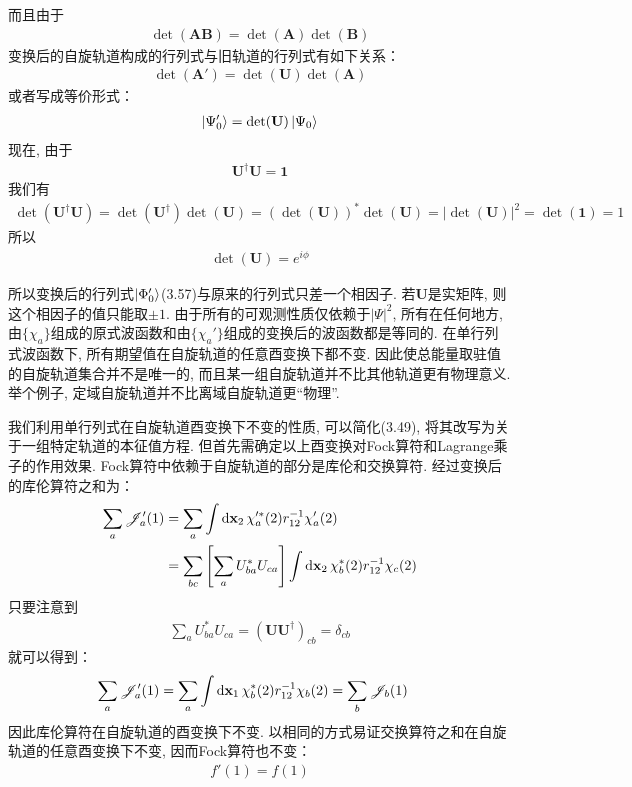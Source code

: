 而且由于
\begin{align}
	\det(\mathbf{AB}) = \det(\mathbf{A})\det(\mathbf{B})
\end{align}
变换后的自旋轨道构成的行列式与旧轨道的行列式有如下关系：
\begin{align}
	\det(\mathbf{A}') = \det(\mathbf{U})\det(\mathbf{A})
\end{align}
或者写成等价形式：
\begin{align}
	\Ket{\Psi_0'} = \det(\mathbf{U})\Ket{\Psi_0}
\end{align}
现在, 
由于
\begin{align}
	\mathbf{U}^\dagger\mathbf{U} = \mathbf{1}
\end{align}
我们有
\begin{align}
	\det(\mathbf{U}^\dagger\mathbf{U}) = \det(\mathbf{U}^\dagger)\det(\mathbf{U}) = (\det(\mathbf{U}))^*\det(\mathbf{U}) = |\det(\mathbf{U})|^2 = \det(\mathbf{1}) = 1
\end{align}
所以
\begin{align}
	\det(\mathbf{U}) = e^{i\phi}
\end{align}

所以变换后的行列式$\Ket{\Phi_0'}$(3.57)与原来的行列式只差一个相因子. 
若$\mathbf{U}$是实矩阵, 
则这个相因子的值只能取$\pm 1$. 
由于所有的可观测性质仅依赖于$|\Psi|^2$, 
所有在任何地方, 
由$\{\chi_a\}$组成的原式波函数和由$\{\chi_a'\}$组成的变换后的波函数都是等同的. 
在单行列式波函数下, 
所有期望值在自旋轨道的任意酉变换下都不变. 
因此使总能量取驻值的自旋轨道集合并不是唯一的, 
而且某一组自旋轨道并不比其他轨道更有物理意义. 
举个例子, 
定域自旋轨道并不比离域自旋轨道更“物理”.


我们利用单行列式在自旋轨道酉变换下不变的性质, 
可以简化(3.49), 
将其改写为关于一组特定轨道的本征值方程. 
但首先需确定以上酉变换对Fock算符和Lagrange乘子的作用效果. 
Fock算符中依赖于自旋轨道的部分是库伦和交换算符. 
经过变换后的库伦算符之和为：
\begin{align}
	\sum_a \scr{J}_a'(1) & = \sum_a\int\dd{x}_2\,\chi_a^{\prime*}(2)\twoe\chi_a'(2)\notag\\
	& = \sum_{bc}\left[ \sum_a U_{ba}^* U_{ca}\right]\int\dd{x}_2\,\chi_b^*(2)\twoe\chi_c(2)
\end{align}
只要注意到
\begin{align}
	\sum_a U_{ba}^* U_{ca} = (\mathbf{UU}^\dagger)_{cb} = \delta_{cb}
\end{align}
就可以得到：
\begin{align}
	\sum_a \scr{J}_a'(1) & = \sum_a\int\dd{x}_1\,\chi_b^{*}(2)\twoe\chi_b(2) = \sum_{b}\scr{J}_b(1)
\end{align}
因此库伦算符在自旋轨道的酉变换下不变. 
以相同的方式易证交换算符之和在自旋轨道的任意酉变换下不变, 
因而Fock算符也不变：
\begin{align}
	f'(1) = f(1)
\end{align}

